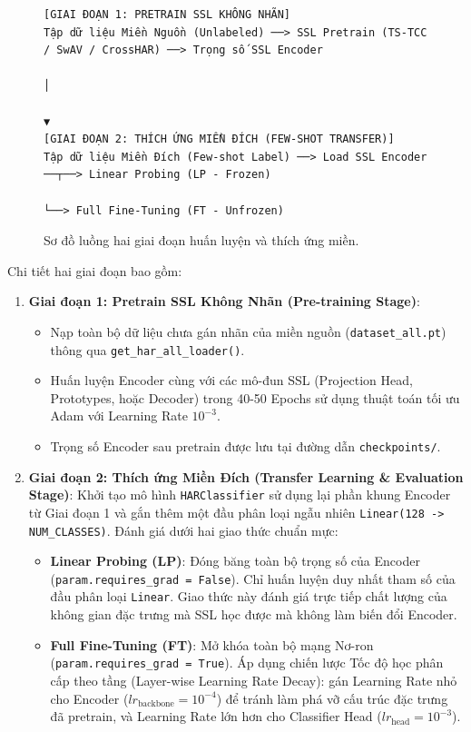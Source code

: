 \begin{figure}[h!]
\centering
\begin{verbatim}
[GIAI ĐOẠN 1: PRETRAIN SSL KHÔNG NHÃN]
Tập dữ liệu Miền Nguồn (Unlabeled) ──> SSL Pretrain (TS-TCC / SwAV / CrossHAR) ──> Trọng số SSL Encoder
                                                                                          │
                                                                                          ▼
[GIAI ĐOẠN 2: THÍCH ỨNG MIỀN ĐÍCH (FEW-SHOT TRANSFER)]
Tập dữ liệu Miền Đích (Few-shot Label) ──> Load SSL Encoder ──┬──> Linear Probing (LP - Frozen)
                                                              └──> Full Fine-Tuning (FT - Unfrozen)
\end{verbatim}
\caption{Sơ đồ luồng hai giai đoạn huấn luyện và thích ứng miền.}
\label{fig:training_pipeline}
\end{figure}

Chi tiết hai giai đoạn bao gồm:
\begin{enumerate}
    \item \textbf{Giai đoạn 1: Pretrain SSL Không Nhãn (Pre-training Stage)}:
    \begin{itemize}
        \item Nạp toàn bộ dữ liệu chưa gán nhãn của miền nguồn (\texttt{dataset\_all.pt}) thông qua \texttt{get\_har\_all\_loader()}.
        \item Huấn luyện Encoder cùng với các mô-đun SSL (Projection Head, Prototypes, hoặc Decoder) trong 40-50 Epochs sử dụng thuật toán tối ưu Adam với Learning Rate $10^{-3}$.
        \item Trọng số Encoder sau pretrain được lưu tại đường dẫn \texttt{checkpoints/}.
    \end{itemize}
    
    \item \textbf{Giai đoạn 2: Thích ứng Miền Đích (Transfer Learning \& Evaluation Stage)}:
    Khởi tạo mô hình \texttt{HARClassifier} sử dụng lại phần khung Encoder từ Giai đoạn 1 và gắn thêm một đầu phân loại ngẫu nhiên \texttt{Linear(128 -> NUM\_CLASSES)}. Đánh giá dưới hai giao thức chuẩn mực:
    \begin{itemize}
        \item \textbf{Linear Probing (LP)}: Đóng băng toàn bộ trọng số của Encoder (\texttt{param.requires\_grad = False}). Chỉ huấn luyện duy nhất tham số của đầu phân loại \texttt{Linear}. Giao thức này đánh giá trực tiếp chất lượng của không gian đặc trưng mà SSL học được mà không làm biến đổi Encoder.
        \item \textbf{Full Fine-Tuning (FT)}: Mở khóa toàn bộ mạng Nơ-ron (\texttt{param.requires\_grad = True}). Áp dụng chiến lược Tốc độ học phân cấp theo tầng (Layer-wise Learning Rate Decay): gán Learning Rate nhỏ cho Encoder ($lr_{\text{backbone}} = 10^{-4}$) để tránh làm phá vỡ cấu trúc đặc trưng đã pretrain, và Learning Rate lớn hơn cho Classifier Head ($lr_{\text{head}} = 10^{-3}$).
    \end{itemize}
\end{enumerate}
